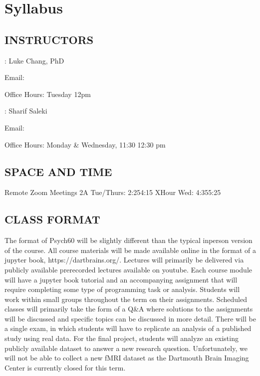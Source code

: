 \documentclass[letterpaper,10pt,english]{sphinxmanual}
\begin{document}
\section{Syllabus}
\label{\detokenize{content/Syllabus:syllabus}}\label{\detokenize{content/Syllabus::doc}}

\subsection{INSTRUCTORS}
\label{\detokenize{content/Syllabus:instructors}}
: Luke Chang, PhD

Email: 

Office Hours: Tuesday 1\sphinxhyphen{}2pm

: Sharif Saleki

Email: 

Office Hours: Monday \& Wednesday, 11:30 \sphinxhyphen{} 12:30 pm


\subsection{SPACE AND TIME}
\label{\detokenize{content/Syllabus:space-and-time}}
Remote Zoom Meetings
2A Tue/Thurs: 2:25\sphinxhyphen{}4:15
X\sphinxhyphen{}Hour Wed:  4:35\sphinxhyphen{}5:25


\subsection{CLASS FORMAT}
\label{\detokenize{content/Syllabus:class-format}}
The format of Psych60 will be slightly different than the typical in\sphinxhyphen{}person version of the course. All course materials will be made available online in the format of a jupyter book, https://dartbrains.org/. Lectures will primarily be delivered via publicly available pre\sphinxhyphen{}recorded lectures available on youtube. Each course module will have a jupyter book tutorial and an accompanying assignment that will require completing some type of programming task or analysis. Students will work within small groups throughout the term on their assignments. Scheduled classes will primarily take the form of a Q\&A where solutions to the assignments will be discussed and specific topics can be discussed in more detail. There will be a single exam, in which students will have to replicate an analysis of a published study using real data. For the final project, students will analyze an existing publicly available dataset to answer a new research question. Unfortunately, we will not be able to collect a new fMRI dataset as the Dartmouth Brain Imaging Center is currently closed for this term.
\end{document}

